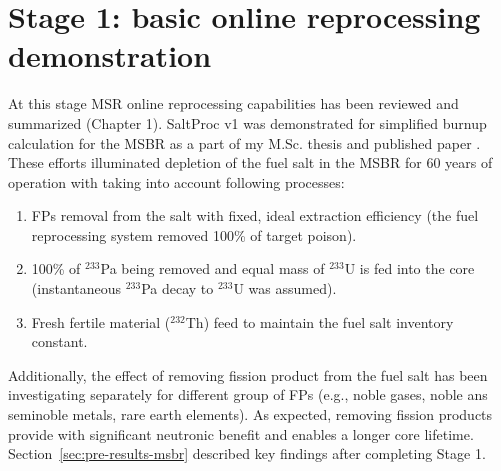 \section{Stage 1: basic online reprocessing demonstration}
At this stage \gls{MSR} online reprocessing capabilities has been reviewed and 
summarized (Chapter 1). SaltProc v1 was demonstrated for simplified burnup 
calculation for the \gls{MSBR} as a part of my M.Sc. thesis 
\cite{rykhlevskii_advanced_2018} and published paper 
\cite{rykhlevskii_modeling_2019}. These efforts illuminated depletion of the 
fuel salt in the \gls{MSBR} for 60 years of operation with taking into account 
following processes:
\begin{enumerate}
	\item \glspl{FP} removal from the salt with fixed, ideal extraction 
	efficiency (the fuel reprocessing system removed 100\% of target poison).
	\item 100\% of $^{233}$Pa being removed and equal mass of $^{233}$U is fed 
	into the core (instantaneous $^{233}$Pa decay to $^{233}$U was assumed).
	\item Fresh fertile material ($^{232}$Th) feed to maintain the fuel salt 
	inventory constant.
\end{enumerate}
Additionally, the effect of removing fission product from the fuel salt has 
been investigating separately for different group of \glspl{FP} (e.g., noble 
gases, noble ans seminoble metals, rare earth elements). As expected, removing 
fission products provide with significant neutronic benefit and enables a 
longer core lifetime. Section~\ref{sec:pre-results-msbr} described key 
findings after completing Stage 1.

